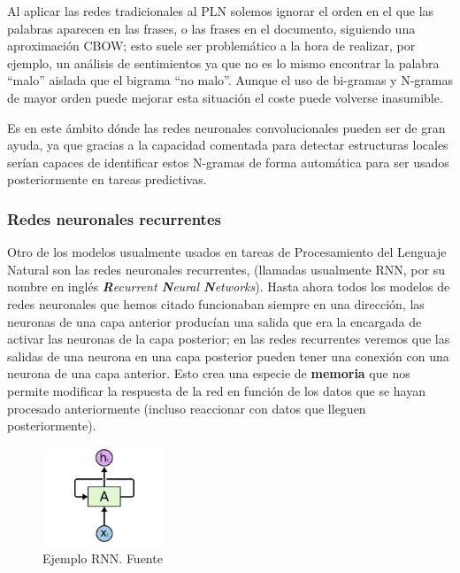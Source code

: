Al aplicar las redes tradicionales al PLN solemos ignorar el orden en el que las palabras aparecen en las frases, o las frases en el documento, siguiendo una aproximación CBOW;  esto suele ser problemático a la hora de realizar, por ejemplo, un análisis de sentimientos ya que no es lo mismo encontrar la palabra ``malo'' aislada que el bigrama ``no malo''. Aunque el uso de bi-gramas y N-gramas de mayor orden puede mejorar esta situación el coste puede volverse inasumible. 

Es en este ámbito dónde las redes neuronales convolucionales pueden ser de gran ayuda, ya que gracias a la capacidad comentada para detectar estructuras locales serían capaces de identificar estos N-gramas de forma automática para ser usados posteriormente en tareas predictivas. 




\subsubsection{Redes neuronales recurrentes}
Otro de los modelos usualmente usados en tareas de Procesamiento del Lenguaje Natural son las redes neuronales recurrentes, (llamadas usualmente RNN, por su nombre en inglés \textit{\textbf{R}ecurrent \textbf{N}eural \textbf{N}etworks}). Hasta ahora todos los modelos de redes neuronales que hemos citado funcionaban siempre en una dirección, las neuronas de una capa anterior producían una salida que era la encargada de activar las neuronas de la capa posterior; en las redes recurrentes veremos que las salidas de una neurona en una capa posterior pueden tener una conexión con una neurona de una capa anterior. Esto crea una especie de \textbf{memoria} que nos permite modificar la respuesta de la red en función de los datos que se hayan procesado anteriormente (incluso reaccionar con datos que lleguen posteriormente).

\begin{figure}[!ht]
	\centering
	\includegraphics[width=0.32\textwidth]{images/arte/rnn}
	\caption{Ejemplo RNN. Fuente \cite{colahblog}}
	\label{fig:rnn}
\end{figure}

